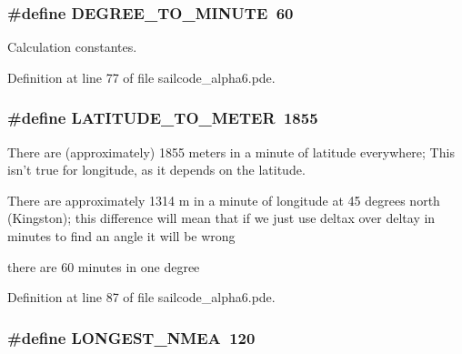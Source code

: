 \hypertarget{group__globalconstants_gaa0fe8a3893ebea828d2bb49ef23e3530}{
\subsubsection[{\-D\-E\-G\-R\-E\-E\-\_\-\-T\-O\-\_\-\-M\-I\-N\-U\-T\-E}]{\setlength{\rightskip}{0pt plus 5cm}\#define \-D\-E\-G\-R\-E\-E\-\_\-\-T\-O\-\_\-\-M\-I\-N\-U\-T\-E~60}}
\label{group__globalconstants_gaa0fe8a3893ebea828d2bb49ef23e3530}


\-Calculation constantes. 



\-Definition at line 77 of file sailcode\-\_\-alpha6.\-pde.

\hypertarget{group__globalconstants_ga334339ea1bc712a2689665192c02bfad}{
\subsubsection[{\-L\-A\-T\-I\-T\-U\-D\-E\-\_\-\-T\-O\-\_\-\-M\-E\-T\-E\-R}]{\setlength{\rightskip}{0pt plus 5cm}\#define \-L\-A\-T\-I\-T\-U\-D\-E\-\_\-\-T\-O\-\_\-\-M\-E\-T\-E\-R~1855}}
\label{group__globalconstants_ga334339ea1bc712a2689665192c02bfad}


\-There are (approximately) 1855 meters in a minute of latitude everywhere; \-This isn't true for longitude, as it depends on the latitude. 

\-There are approximately 1314 m in a minute of longitude at 45 degrees north (\-Kingston); this difference will mean that if we just use deltax over deltay in minutes to find an angle it will be wrong

there are 60 minutes in one degree 

\-Definition at line 87 of file sailcode\-\_\-alpha6.\-pde.

\hypertarget{group__globalconstants_ga0038dced6b4ccdfe2ef833cc1965ca73}{
\subsubsection[{\-L\-O\-N\-G\-E\-S\-T\-\_\-\-N\-M\-E\-A}]{\setlength{\rightskip}{0pt plus 5cm}\#define \-L\-O\-N\-G\-E\-S\-T\-\_\-\-N\-M\-E\-A~120}}
\label{group__globalconstants_ga0038dced6b4ccdfe2ef833cc1965ca73}


